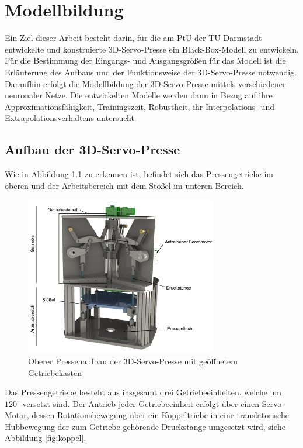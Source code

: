 \chapter{Modellbildung}

Ein Ziel dieser Arbeit besteht darin, für die am PtU der TU Darmstadt entwickelte und konstruierte 3D-Servo-Presse ein Black-Box-Modell zu entwickeln. Für die Bestimmung der Eingangs- und Ausgangsgrößen für das Modell ist die Erläuterung des Aufbaus und der Funktionsweise der 3D-Servo-Presse notwendig. Daraufhin erfolgt die Modellbildung der 3D-Servo-Presse mittels verschiedener neuronaler Netze. Die entwickelten Modelle werden dann in Bezug auf ihre Approximationsfähigkeit, Trainingszeit, Robustheit, ihr Interpolations- und Extrapolationsverhaltens untersucht.

\section{Aufbau der 3D-Servo-Presse}

Wie in Abbildung \ref{fig:3d-servo} zu erkennen ist, befindet sich das Pressengetriebe im oberen und der Arbeitsbereich mit dem Stößel im unteren Bereich.

\begin{figure} [h]
	\centering
	\includegraphics[width=0.75\textwidth]{images/3D-Servo-Presse}
	\caption{Oberer Pressenaufbau der 3D-Servo-Presse mit geöffnetem Getriebekasten \cite{Rakowitsch.2018}}
	\label{fig:3d-servo}
\end{figure}

Das Pressengetriebe besteht aus insgesamt drei Getriebeeinheiten, welche um $120^\circ$ versetzt sind. Der Antrieb jeder Getriebeeinheit erfolgt über einen Servo-Motor, dessen Rotationsbewegung über ein Koppeltriebe in eine translatorische Hubbewegung der zum Getriebe gehörende Druckstange umgesetzt wird, siehe Abbildung \ref{fig:koppel}.

